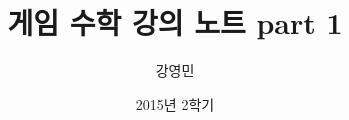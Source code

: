 \documentclass{beamer}
\title[게임수학 강의]{ 게임 수학 강의 노트 part 1}
\author{강영민}
\institute{동명대학교}
\date{2015년 2학기}
\begin{document}
\begin{frame}
  \titlepage
\end{frame}










\end{document}
